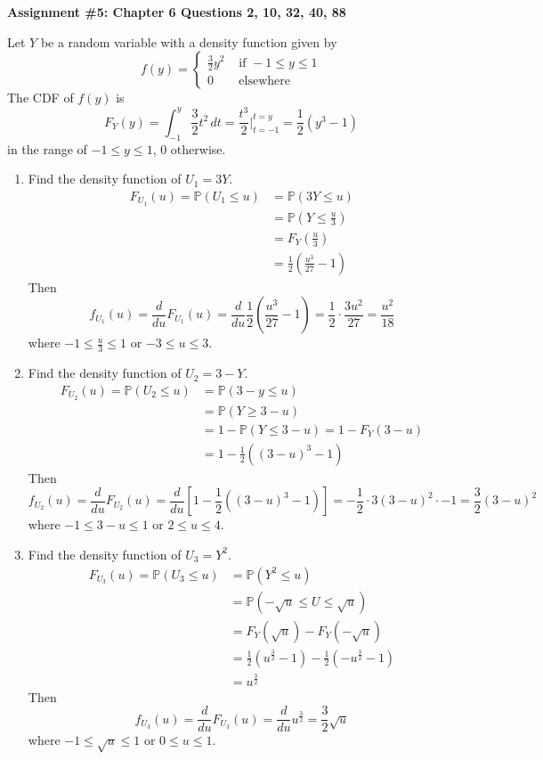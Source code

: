 \documentclass[12pt]{article}
\newcommand{\ques}[1]{\noindent {\bf Question #1: }}
\newcommand{\prob}[1]{\mathbb{P}(#1)}
\begin{document}
\begin{center} \textbf{Assignment \#5: Chapter 6 Questions 2, 10, 32, 40, 88} \end{center}

\ques{6.2} Let $Y$ be a random variable with a density function given by 
$$ f(y) = \begin{cases} \frac{3}{2}y^2 &\text{ if } -1 \leq y \leq 1 \\ 0 &\text{ elsewhere } \end{cases} $$ 
The CDF of $f(y)$ is $$ F_Y(y) = \int_{-1}^y \frac{3}{2}t^2 \, dt = \frac{t^3}{2}\Bigg|_{t = -1}^{t = y} = \frac{1}{2}(y^3 - 1) $$ in the range of $-1 \leq y \leq 1$, $0$ otherwise. 
\begin{enumerate} 
\item Find the density function of $U_1 = 3Y$. 
$$ \begin{aligned} 
F_{U_1}(u) = \prob{U_1 \leq u} &= \prob{3Y \leq u} \\ &= \prob{Y \leq \frac{u}{3}} \\ &= F_Y(\frac{u}{3}) \\ &= \frac{1}{2}(\frac{u^3}{27} - 1) 
\end{aligned} $$ Then $$ f_{U_1}(u) = \frac{d}{du} F_{U_1}(u) = \frac{d}{du} \frac{1}{2}(\frac{u^3}{27} - 1)  = \frac{1}{2} \cdot \frac{3u^2}{27} =  \frac{u^2}{18} $$ where  $ -1 \leq \frac{u}{3} \leq 1$ or $-3 \leq u \leq 3$. 
\item Find the density function of $U_2 = 3 - Y$. 
$$ \begin{aligned} 
F_{U_2}(u) = \prob{U_2 \leq u} &= \prob{3-y \leq u} \\ &= \prob{Y \geq 3 -u} \\ &= 1 - \prob{Y \leq 3-u} = 1 - F_Y(3-u) \\ &= 1 - \frac{1}{2}((3-u)^3 - 1)
\end{aligned} $$ Then
$$ f_{U_2}(u) = \frac{d}{du} F_{U_2}(u) = \frac{d}{du} [1 - \frac{1}{2}((3-u)^3 - 1)] = -\frac{1}{2} \cdot 3(3-u)^2 \cdot -1 = \frac{3}{2}(3-u)^2$$ where $-1 \leq 3-u \leq 1$ or $2 \leq u \leq 4$. 

\item Find the density function of $U_3 = Y^2$. 
$$ \begin{aligned} 
F_{U_3}(u) = \prob{U_3 \leq u} &= \prob{Y^2 \leq u} \\ &= \prob{-\sqrt{u} \leq U \leq \sqrt{u}} \\ &= F_Y(\sqrt{u}) - F_Y(-\sqrt{u}) \\ &= \frac{1}{2}(u^{\frac{3}{2}} - 1) - \frac{1}{2}(-u^{\frac{3}{2}} - 1) \\ &= u^{\frac{3}{2}} 
\end{aligned} $$ Then
$$ f_{U_3}(u) = \frac{d}{du} F_{U_3}(u) = \frac{d}{du} u^{\frac{3}{2}} = \frac{3}{2}\sqrt{u} $$ where $ -1 \leq \sqrt{u} \leq 1$ or $0 \leq u \leq 1$. 
\end{enumerate} 
\end{document}
